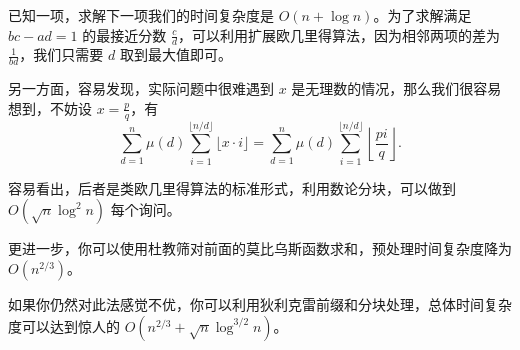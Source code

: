 已知一项，求解下一项我们的时间复杂度是 $O(n + \log n)$。为了求解满足 $bc - ad = 1$ 的最接近分数 $\frac{c}{d}$，可以利用扩展欧几里得算法，因为相邻两项的差为 $\frac{1}{bd}$，我们只需要 $d$ 取到最大值即可。

另一方面，容易发现，实际问题中很难遇到 $x$ 是无理数的情况，那么我们很容易想到，不妨设 $x = \frac{p}{q}$，有
\[
\sum_{d = 1}^{n} \mu(d) \sum_{i = 1}^{\lfloor n/d \rfloor} \lfloor x \cdot i \rfloor
= \sum_{d = 1}^{n} \mu(d) \sum_{i = 1}^{\lfloor n/d \rfloor} \left\lfloor \frac{p i}{q} \right\rfloor.
\]

容易看出，后者是类欧几里得算法的标准形式，利用数论分块，可以做到 $O(\sqrt{n} \log^2 n)$ 每个询问。

更进一步，你可以使用杜教筛对前面的莫比乌斯函数求和，预处理时间复杂度降为 $O(n^{2/3})$。

如果你仍然对此法感觉不优，你可以利用狄利克雷前缀和分块处理，总体时间复杂度可以达到惊人的 $O(n^{2/3} + \sqrt{n} \log^{3/2} n)$。